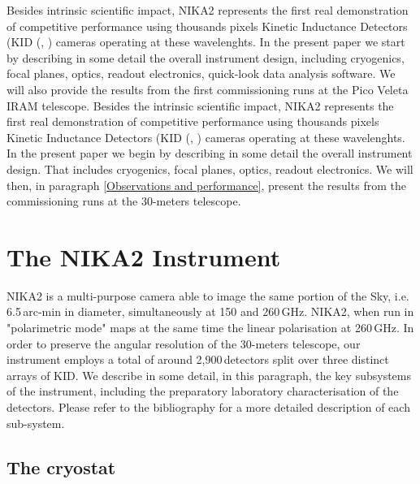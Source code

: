 \documentclass[]{aa} %
\begin{document}
Besides intrinsic scientific impact, NIKA2 represents the first real demonstration of competitive performance using thousands pixels Kinetic Inductance Detectors (KID (\cite{Day2003}, \cite{Doyle2010}) cameras operating at these wavelenghts. In the present paper we start by describing in some detail the overall instrument design, including cryogenics, focal planes, optics, readout electronics, quick-look data analysis software. We will also provide the results from the first commissioning runs at the Pico Veleta IRAM telescope. 
Besides the intrinsic scientific impact, NIKA2 represents the first real demonstration of competitive performance using thousands pixels Kinetic Inductance Detectors (KID (\cite{Day2003}, \cite{Doyle2010}) cameras operating at these wavelenghts. In the present paper we begin by describing in some detail the overall instrument design. That includes cryogenics, focal planes, optics, readout electronics. We will then, in paragraph \ref{Observations and performance}, present the results from the commissioning runs at the 30-meters telescope. 


\section{The NIKA2 Instrument}

NIKA2 is a multi-purpose camera able to image the same portion of the Sky, i.e. 6.5\,arc-min in diameter, simultaneously at 150 and 260\,GHz. NIKA2, when run in "polarimetric mode"  maps at the same time the linear polarisation  at 260\,GHz. In order to preserve the angular resolution of the 30-meters telescope, our instrument employs a total of around 2,900\,detectors split over three distinct arrays of KID. We describe in some detail, in this paragraph, the key subsystems of the instrument, including the preparatory laboratory characterisation of the detectors. Please refer to the bibliography for a more detailed description of each sub-system. 


 \subsection{The cryostat}
\end{document}

